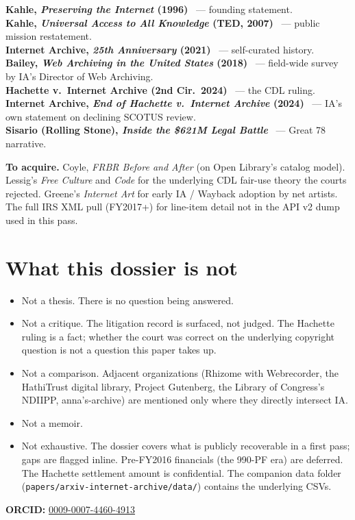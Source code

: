 \documentclass[10pt,letterpaper,twocolumn]{article}
\begin{document}
\textbf{Kahle, \emph{Preserving the Internet} (1996)}~\citep{kahle1996preserving} --- founding statement.\\
\textbf{Kahle, \emph{Universal Access to All Knowledge} (TED, 2007)}~\citep{kahle2007universal} --- public mission restatement.\\
\textbf{Internet Archive, \emph{25th Anniversary} (2021)}~\citep{ia25anniversary} --- self-curated history.\\
\textbf{Bailey, \emph{Web Archiving in the United States} (2018)}~\citep{bailey2018web} --- field-wide survey by IA's Director of Web Archiving.\\
\textbf{Hachette v.~Internet Archive (2nd Cir.~2024)}~\citep{hachette2024affirm} --- the CDL ruling.\\
\textbf{Internet Archive, \emph{End of Hachette v.~Internet Archive} (2024)}~\citep{iablog2024endhachette} --- IA's own statement on declining SCOTUS review.\\
\textbf{Sisario (Rolling Stone), \emph{Inside the \$621M Legal Battle}}~\citep{rollingstone2024great78} --- Great 78 narrative.

\textbf{To acquire.} Coyle, \emph{FRBR Before and After} (on Open Library's catalog model). Lessig's \emph{Free Culture} and \emph{Code} for the underlying CDL fair-use theory the courts rejected. Greene's \emph{Internet Art} for early IA / Wayback adoption by net artists. The full IRS XML pull (FY2017+) for line-item detail not in the API v2 dump used in this pass.

\section{What this dossier is not}

\begin{itemize}
  \item Not a thesis. There is no question being answered.
  \item Not a critique. The litigation record is surfaced, not judged. The Hachette ruling is a fact; whether the court was correct on the underlying copyright question is not a question this paper takes up.
  \item Not a comparison. Adjacent organizations (Rhizome with Webrecorder, the HathiTrust digital library, Project Gutenberg, the Library of Congress's NDIIPP, anna's-archive) are mentioned only where they directly intersect IA.
  \item Not a memoir.
  \item Not exhaustive. The dossier covers what is publicly recoverable in a first pass; gaps are flagged inline. Pre-FY2016 financials (the 990-PF era) are deferred. The Hachette settlement amount is confidential. The companion data folder (\texttt{papers/arxiv-internet-archive/data/}) contains the underlying CSVs.
\end{itemize}

\vspace{0.5em}
\noindent\textbf{ORCID:} \href{https://orcid.org/0009-0007-4460-4913}{0009-0007-4460-4913}



\end{document}
